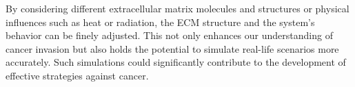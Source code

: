 By considering different extracellular matrix molecules and structures or physical influences such as heat or radiation, the ECM structure and the system's behavior can be finely adjusted. This not only enhances our understanding of cancer invasion but also holds the potential to simulate real-life scenarios more accurately. Such simulations could significantly contribute to the development of effective strategies against cancer.
